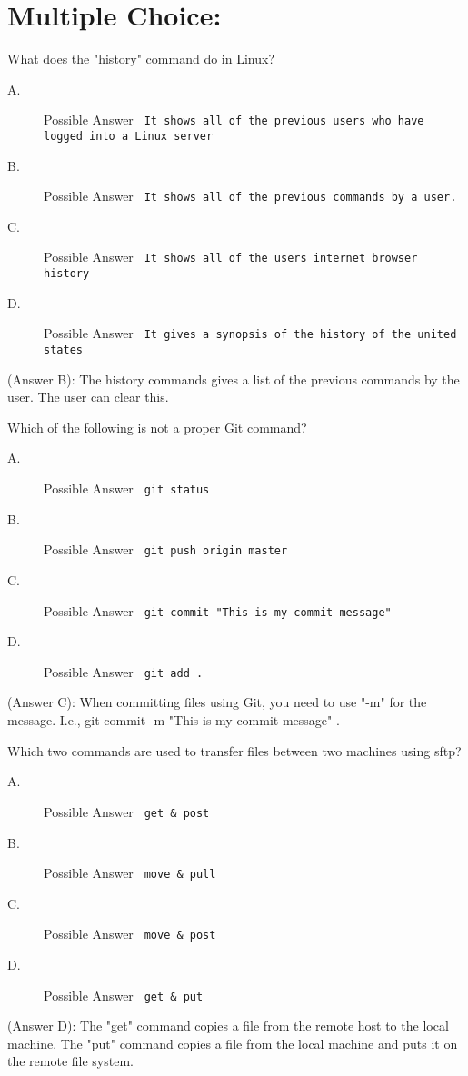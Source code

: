 \documentclass[12pt,answers]{exam}
\begin{document}
\section*{Multiple Choice:}
\begin{questions}
\question What does the "history" command do in Linux?
\begin{description}
\item[A.] Possible Answer \verb' It shows all of the previous users who have logged into a Linux server'
\item[B.] Possible Answer \verb' It shows all of the previous commands by a user.'
\item[C.] Possible Answer \verb' It shows all of the users internet browser history'   
\item[D.] Possible Answer \verb' It gives a synopsis of the history of the united states'     
\end{description}
\begin{solution}
(Answer B): The history commands gives a list of the previous commands by the user. The user can clear this.  
\end{solution}

\question Which of the following is not a proper Git command?
\begin{description}
\item[A.] Possible Answer \verb' git status'
\item[B.] Possible Answer \verb' git push origin master'
\item[C.] Possible Answer \verb' git commit "This is my commit message"'    
\item[D.] Possible Answer \verb' git add .'     
\end{description}
\begin{solution}
(Answer C): When committing files using Git, you need to use "-m" for the message. I.e., git commit -m "This is my commit message" .  
\end{solution}

\question Which two commands are used to transfer files between two machines using sftp?
\begin{description}
\item[A.] Possible Answer \verb' get & post'
\item[B.] Possible Answer \verb' move & pull'
\item[C.] Possible Answer \verb' move & post'   
\item[D.] Possible Answer \verb' get & put'     
\end{description}
\begin{solution}
(Answer D): The "get" command copies a file from the remote host to the local machine. The "put" command copies a file from the local machine and puts it on the remote file system.  
\end{solution}


\end{questions}
\end{document}
